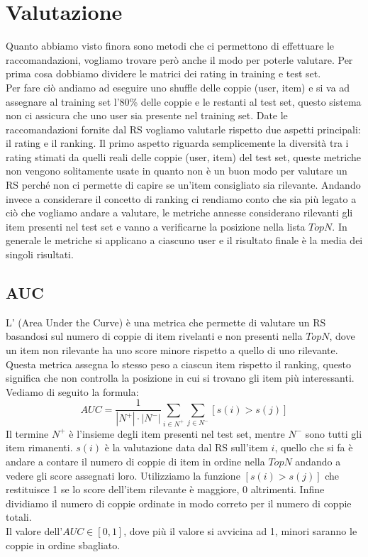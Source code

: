 \section{Valutazione}
Quanto abbiamo visto finora sono metodi che ci permettono di effettuare le raccomandazioni, vogliamo trovare però anche il modo per poterle valutare. Per prima cosa dobbiamo dividere le matrici dei rating in training e test set.\\
Per fare ciò andiamo ad eseguire uno shuffle delle coppie (user, item) e si va ad assegnare al training set l'80\% delle coppie e le restanti al test set, questo sistema non ci assicura che uno user sia presente nel training set.
Date le raccomandazioni fornite dal RS vogliamo valutarle rispetto due aspetti principali: il rating e il ranking.
Il primo aspetto riguarda semplicemente la diversità tra i rating stimati da quelli reali delle coppie (user, item) del test set, queste metriche non vengono solitamente usate in quanto non è un buon modo per valutare un RS perché non ci permette di capire se un'item consigliato sia rilevante.
Andando invece a considerare il concetto di ranking ci rendiamo conto che sia più legato a ciò che vogliamo andare a valutare, le metriche annesse considerano rilevanti gli item presenti nel test set e vanno a verificarne la posizione nella lista $TopN$.
In generale le metriche si applicano a ciascuno user e il risultato finale è la media dei singoli risultati.

\subsection{AUC}
L' (Area Under the Curve) è una metrica che permette di valutare un RS basandosi sul numero di coppie di item rivelanti e non presenti nella $TopN$, dove un item non rilevante ha uno score minore rispetto a quello di uno rilevante. Questa metrica assegna lo stesso peso a ciascun item rispetto il ranking, questo significa che non controlla la posizione in cui si trovano gli item più interessanti. Vediamo di seguito la formula:
$$AUC = \frac{1}{|N^{+}|\cdot|N^{-}|}\sum_{i \in N^{+}} \sum_{j \in N^{-}} [s(i) > s(j)]$$
Il termine $N^{+}$ è l'insieme degli item presenti nel test set, mentre $N^{-}$ sono tutti gli item rimanenti. $s(i)$ è la valutazione data dal RS sull'item $i$, quello che si fa è andare a contare il numero di coppie di item in ordine nella $TopN$ andando a vedere gli score assegnati loro.
Utilizziamo la funzione $[s(i) > s(j)]$ che restituisce 1 se lo score dell'item rilevante è maggiore, 0 altrimenti. Infine dividiamo il numero di coppie ordinate in modo correto per il numero di coppie totali.\\
Il valore dell'$AUC \in [0,1]$, dove più il valore si avvicina ad 1, minori saranno le coppie in ordine sbagliato.

